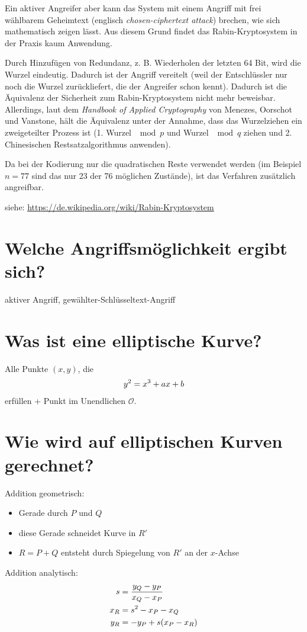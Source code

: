 \documentclass{article}
\begin{document}
	Ein aktiver Angreifer aber kann das System mit einem Angriff mit frei wählbarem Geheimtext (englisch \textit{chosen-ciphertext attack}) brechen, wie sich mathematisch zeigen lässt. Aus diesem Grund findet das Rabin-Kryptosystem in der Praxis kaum Anwendung.
	
	Durch Hinzufügen von Redundanz, z. B. Wiederholen der letzten 64 Bit, wird die Wurzel eindeutig. Dadurch ist der Angriff vereitelt (weil der Entschlüssler nur noch die Wurzel zurückliefert, die der Angreifer schon kennt). Dadurch ist die Äquivalenz der Sicherheit zum Rabin-Kryptosystem nicht mehr beweisbar. Allerdings, laut dem \textit{Handbook of Applied Cryptography} von Menezes, Oorschot und Vanstone, hält die Äquivalenz unter der Annahme, dass das Wurzelziehen ein zweigeteilter Prozess ist (1. Wurzel $\mod p$ und Wurzel $\mod q$ ziehen und 2. Chinesischen Restsatzalgorithmus anwenden).
	
	Da bei der Kodierung nur die quadratischen Reste verwendet werden (im Beispiel $n = 77$ sind das nur 23 der 76 möglichen Zustände), ist das Verfahren zusätzlich angreifbar.
	
	siehe: \url{https://de.wikipedia.org/wiki/Rabin-Kryptosystem}
	
	\section*{Welche Angriffsmöglichkeit ergibt sich?}
	aktiver Angriff, gewählter-Schlüsseltext-Angriff
	
	\section*{Was ist eine elliptische Kurve?}
	Alle Punkte $(x,y)$, die
	\begin{align}
		y^2 = x^3 + ax + b \notag
	\end{align}
	erfüllen + Punkt im Unendlichen $\mathcal{O}$.
	
	\section*{Wie wird auf elliptischen Kurven gerechnet?}
	Addition geometrisch:
	\begin{itemize}
		\item Gerade durch $P$ und $Q$
		\item diese Gerade schneidet Kurve in $R'$
		\item $R = P + Q$ entsteht durch Spiegelung von $R'$ an der $x$-Achse
	\end{itemize}

	Addition analytisch:
	\begin{align}
		s &= \frac{y_Q - y_P}{x_Q - x_P} \notag \\
		x_R &= s^2 - x_P - x_Q \notag \\
		y_R &= -y_P + s(x_P - x_R) \notag
	\end{align}
	
\end{document}
